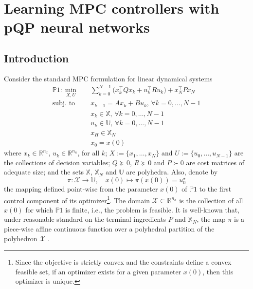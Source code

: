 \cleardoublepage
\chapter{Learning MPC controllers with pQP neural networks}

\section{Introduction}
\label{sec.chap4_intro}

Consider the standard MPC formulation for linear dynamical systems
\begin{subequations}
	\label{eq:linearmpc}
	\begin{align}
		\mathds{P}1: \min_{X,U} \quad & \sum_{k=0}^{N-1} \big( x_k^\top Q x_k + u_k^\top R u_k \big) + x_N^\top P x_N \label{eq.MPC_classical_cost}\\
		\text{subj. to} \quad 
		& x_{k+1} = A x_{k} + B u_{k}, \, \forall k = 0,\dots,N-1  \\
		& x_{k} \in \mathbb{X}, \, \forall k = 0,\dots,N-1 \\
		& u_{k} \in \mathbb{U}, \, \forall k = 0,\dots,N-1 \\
		& x_{H} \in \mathbb{X}_N \\
		& x_0 = x(0)
	\end{align}
\end{subequations}
where $x_k \in \mathbb{R}^{n_x}$, $u_k \in \mathbb{R}^{n_u}$, for all $k$; $X:=\{x_1,\dots,x_{N}\}$ and $U:=\{u_0,\dots,u_{N-1}\}$ are the collections of decision variables; $Q \succeq 0$, $R \succeq 0$ and $P \succ 0$ are cost matrices of adequate size; and the sets $\mathbb{X}$, $\mathbb{X}_N$ and $\mathbb{U}$ are polyhedra. Also, denote by 
\begin{equation}
	\pi: \mathcal{X} \rightarrow \mathbb{U}, \quad x(0) \mapsto \pi(x(0)) = u_0^\star
\end{equation} 
the mapping defined point-wise from the parameter $x(0)$ of $\mathds{P}1$ to the first control component of its optimizer\footnote{Since the objective is strictly convex and the constraints define a convex feasible set, if an optimizer exists for a given parameter $x(0)$, then this optimizer is unique.}. The domain $\mathcal{X} \subset \mathbb{R}^{n_x}$ is the collection of all $x(0)$ for which $\mathds{P}1$ is finite, i.e., the problem is feasible. It is well-known that, under reasonable standard on the terminal ingredients $P$ and $\mathbb{X}_N$, the map $\pi$ is a piece-wise affine continuous function over a polyhedral partition of the polyhedron $\mathcal{X}$ \citep{bemporad2002explicit,borrelli2017predictive}. 

